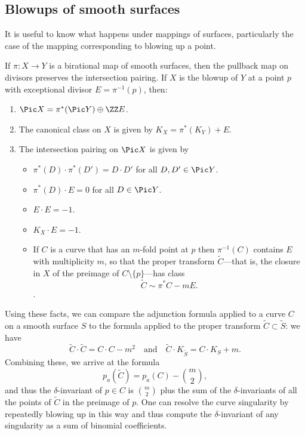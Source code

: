 \subsection{Blowups of smooth surfaces}\label{delta 2} 

It is useful to know what happens under mappings of surfaces, particularly the case of the mapping
corresponding to blowing up a point.

\begin{theorem}\label{divisor classes on blowup}
If $\pi: X \to Y$ is a birational map of smooth surfaces, then the pullback map on divisors
preserves the intersection pairing. If $X$ is the blowup of $Y$ at a point $p$ with exceptional
divisor $E = \pi^{-1}(p)$, then:

\begin{enumerate}
 \item $\Pic X =\pi^*(\Pic Y) \oplus \ZZ E$.
\item The canonical class on $X$ is given by $K_X = \pi^*(K_Y)+E$.
 \item The intersection pairing on $\Pic X$ is given by
 
\begin{itemize}
\item $\pi^*(D)\cdot\pi^*(D') = D\cdot D'$ for all $D,D'\in \Pic Y$.
\item $\pi^*(D)\cdot E = 0$ for all $D\in \Pic Y$.
 \item $E\cdot E = -1$.
 \item $K_X\cdot E = -1$.
 \item If $C$ is a curve that has an $m$-fold point at $p$ then $\pi^{-1}(C)$ contains $E$ with multiplicity $m$, so that the proper transform $\tilde C$---that is, the closure in $X$ of the preimage of $C \setminus \{p\}$---has class
 $$
 \tilde C \sim \pi^*C - mE.
 $$.
 \end{itemize}
\end{enumerate}
\end{theorem}

Using these facts, we can compare the adjunction formula applied to a curve $C$ on a smooth surface $S$ to the formula applied to the proper transform $\tilde C \subset \tilde S$: we have
$$
\tilde C \cdot \tilde C = C \cdot C - m^2 \quad \text{and} \quad \tilde C \cdot K_{\tilde S} = C \cdot K_S + m.
$$
Combining these, we arrive at the formula
$$
p_a(\tilde C) = p_a(C) - \binom{m}{2},
$$
and thus the $\delta$-invariant of $p \in C$ is $\binom{m}{2}$ plus the sum of the $\delta$-invariants of all the 
points of $\tilde C$ in the preimage of $p$. One can resolve the curve singularity by repeatedly blowing up in this way and thus compute the $\delta$-invariant
of any singularity as a sum of binomial coefficients.

